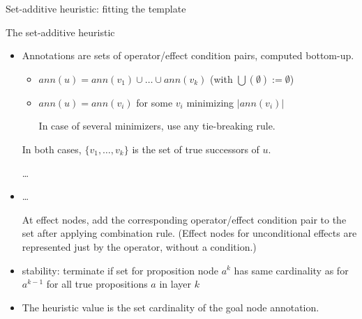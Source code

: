 \documentclass{gkibeamer}
\begin{document}
\begin{frame}{Set-additive heuristic: fitting the
    template}
  \begin{block}{The set-additive heuristic {\hsa}}
    \begin{overprint}
    \begin{itemize}
    \item Annotations are \alert{sets of operator/effect condition
      pairs}, computed bottom-up.
      \smallskip

      \begin{itemize}
      \item $\textit{ann}(u) = \textit{ann}(v_1) \cup \dots
	\cup \textit{ann}(v_k)$
	(with $\bigcup(\emptyset) := \emptyset$)
      \end{itemize}

      \begin{itemize}
      \item $\textit{ann}(u) = \textit{ann}(v_i)$
	for some $v_i$ minimizing $|\textit{ann}(v_i)|$

	In case of several minimizers, use any tie-breaking rule.
      \end{itemize}

      In both cases, $\{v_1, \dots, v_k\}$ is the set of true
      successors of $u$.

      \smallskip

      \dots
    \end{itemize}

    \begin{itemize}
    \item \dots

      \smallskip

      At \alert{effect nodes}, \alert{add the corresponding
	operator/effect condition pair} to the set after applying
      combination rule. (Effect nodes for unconditional effects are
      represented just by the operator, without a condition.)
    \end{itemize}
    
    \begin{itemize}
    \item \alert{stability:} terminate if set for proposition node
      $a^k$ has same cardinality as for $a^{k-1}$ for all true
      propositions $a$ in layer $k$
    \end{itemize}
    
    \begin{itemize}
    \item The heuristic value is the \alert{set cardinality} of the
      goal node annotation.
    \end{itemize}
    \end{overprint}
  \end{block}
\end{frame}
\end{document}
